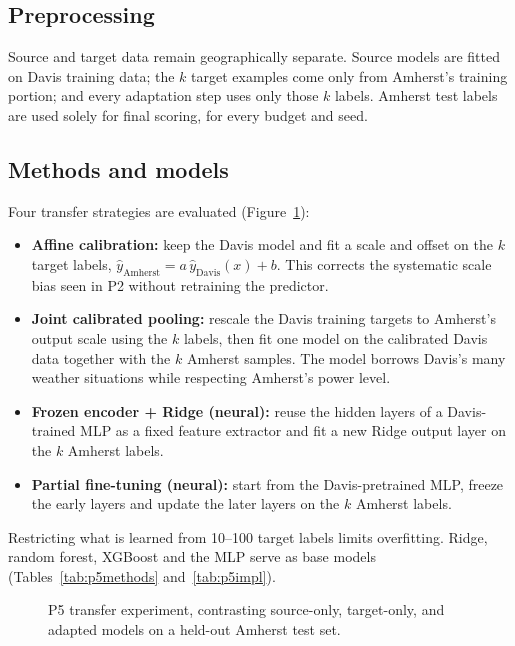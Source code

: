 \documentclass[11pt,letterpaper]{article}
\newcommand{\tikzfit}[1]{\resizebox{\textwidth}{!}{}}
\begin{document}
\subsection{Preprocessing}
Source and target data remain geographically separate. Source models are fitted on Davis
training data; the $k$ target examples come only from Amherst's training portion; and every
adaptation step uses only those $k$ labels. Amherst test labels are used solely for final scoring,
for every budget and seed.

\subsection{Methods and models}
Four transfer strategies are evaluated (Figure~\ref{fig:p5flow}):
\begin{itemize}[leftmargin=1.5em,itemsep=2pt]
\item \textbf{Affine calibration:} keep the Davis model and fit a scale and offset on the $k$ target
labels, $\hat y_{\mathrm{Amherst}} = a\,\hat y_{\mathrm{Davis}}(x) + b$. This corrects the systematic
scale bias seen in P2 without retraining the predictor.
\item \textbf{Joint calibrated pooling:} rescale the Davis training targets to Amherst's output
scale using the $k$ labels, then fit one model on the calibrated Davis data together with the $k$
Amherst samples. The model borrows Davis's many weather situations while respecting Amherst's
power level.
\item \textbf{Frozen encoder + Ridge (neural):} reuse the hidden layers of a Davis-trained MLP as a
fixed feature extractor and fit a new Ridge output layer on the $k$ Amherst labels.
\item \textbf{Partial fine-tuning (neural):} start from the Davis-pretrained MLP, freeze the early
layers and update the later layers on the $k$ Amherst labels.
\end{itemize}
Restricting what is learned from 10--100 target labels limits overfitting. Ridge, random forest,
XGBoost and the MLP serve as base models (Tables~\ref{tab:p5methods} and~\ref{tab:p5impl}).



\begin{figure}[!htbp]\centering
\tikzfit{p5_transfer}
\caption{P5 transfer experiment, contrasting source-only, target-only, and adapted models on a held-out Amherst test set.}\label{fig:p5flow}
\end{figure}
\end{document}
